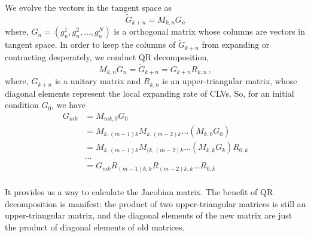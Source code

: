    We evolve the vectors in the tangent space as
   \begin{equation}
    \tilde{G}_{k+n}=M_{k,n}G_{n}
   \end{equation}
   where, $G_{n}=(g^{1}_{n},g^{2}_{n},\dots ,g^{N}_{n})$ is a orthogonal matrix
   whose columns are vectors in tangent space. In order to keep the
   columns of $\tilde{G}_{k+n}$ from expanding or contracting desperately,
   we conduct QR decomposition,
    \begin{equation}
    M_{k,n}G_{n}=\tilde{G}_{k+n}=G_{k+n}R_{k,n}
    \,,
    \label{eq::xiong_qr}
   \end{equation}
where, $G_{k+n}$ is a unitary matrix and $R_{k,n}$ is an upper-triangular matrix, whose diagonal
    elements represent the local expanding rate of CLVs.
    So, for an initial condition $G_{0}$, we have
    \begin{align*}
     G_{mk} &=M_{mk,0}G_{0} \\
     & =M_{k,(m-1)k}M_{k,(m-2)k}\dots (M_{k,0}G_{0}) \\
     & =M_{k,(m-1)k}M_{(k,(m-2)k}\dots (M_{k,k}G_{k})R_{0,k} \\
     & \dots  \\
     & =G_{mk}R_{(m-1)k,k}R_{(m-2)k,k}\dots R_{0,k} \\
    \end{align*}

    It provides us a way to calculate the Jacobian matrix. The benefit of QR decomposition is manifest:
    the product of two upper-triangular matrices is still an upper-triangular matrix, and the diagonal
    elements of the new matrix are just the product of diagonal elements of old matrices.


